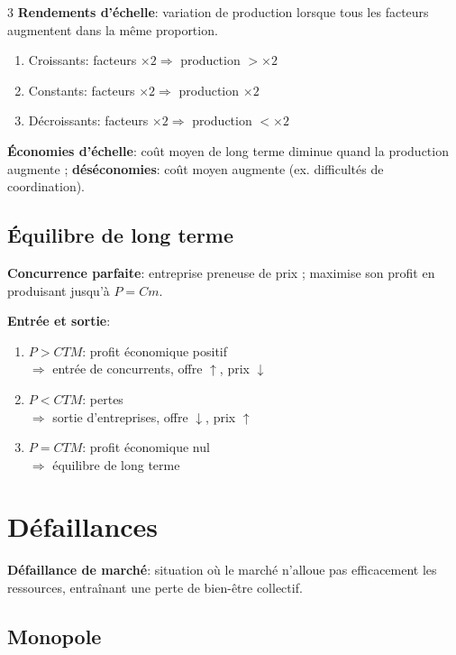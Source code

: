 \documentclass[12pt, a4paper]{article}
\begin{document}
\begin{multicols*}{3}
\textbf{Rendements d'échelle}: variation de production lorsque tous les facteurs augmentent dans la même proportion.
\begin{enumerate}[\roman*.]
  \item Croissants: facteurs $\times2\Rightarrow$ production $> \times2$
  \item Constants: facteurs $\times2\Rightarrow$ production $\times2$
  \item Décroissants: facteurs $\times2\Rightarrow$ production $< \times2$
\end{enumerate}

\textbf{Économies d'échelle}: coût moyen de long terme diminue quand la production augmente ; \textbf{déséconomies}: coût moyen augmente (ex. difficultés de coordination).

{\centering{}\par}
\vspace{-1em}
\subsection{Équilibre de long terme}

\textbf{Concurrence parfaite}: entreprise preneuse de prix ; maximise son profit en produisant jusqu'à $P=Cm$.

\textbf{Entrée et sortie}:
\begin{enumerate}[\roman*.]
  \item $P>CTM$: profit économique positif \\$\Rightarrow$ entrée de concurrents, offre $\uparrow$, prix $\downarrow$
  \item $P<CTM$: pertes \\$\Rightarrow$ sortie d'entreprises, offre $\downarrow$, prix $\uparrow$
  \item $P=CTM$: profit économique nul \\$\Rightarrow$ équilibre de long terme
\end{enumerate}
{\centering{}\par}
\vspace{-1em}
\colbreak
\section{Défaillances}

\textbf{Défaillance de marché}: situation où le marché n'alloue pas efficacement les ressources, entraînant une perte de bien-être collectif.

\subsection{Monopole}


\end{multicols*}
\end{document}
